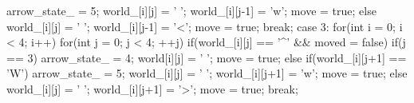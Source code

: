 \begin{answercode}
{{{{{                        {
                            arrow_state_ = 5;
                            world_[i][j] = ' ';
                            world_[i][j-1] = 'w';
                            move = true;
                        }
                        else
                        {
                            world_[i][j] = ' ';
                            world_[i][j-1] = '<';
                            move = true;
                        }
                    }
                }
            }
            break;
        case 3:
            for(int i = 0; i < 4; i++)
            {
                for(int j = 0; j < 4; ++j)
                {
                    if(world_[i][j] == '^' && moved = false)
                    {
                        if(j == 3)
                        {
                            arrow_state_ = 4;
                            world[i][j] = ' ';
                            move = true;
                        }
                        else if(world_[i][j+1] == 'W')
                        {
                            arrow_state_ = 5;
                            world_[i][j] = ' ';
                            world_[i][j+1] = 'w';
                            move = true;
                        }
                        else
                        {
                            world_[i][j] = ' ';
                            world_[i][j+1] = '>';
                            move = true;
                        }
                    }
                }
            }
            break;
    }
}

\end{answercode}

\newpage


